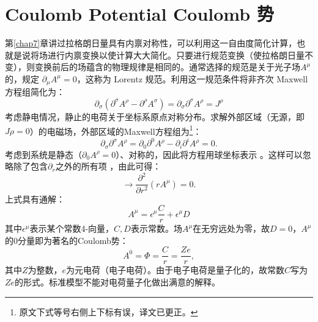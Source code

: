 \section[Coulomb 势]{Coulomb Potential \quad Coulomb 势}
\label{sec11.3}
第\ref{chap7}章讲过拉格朗日量具有内禀对称性，可以利用这一自由度简化计算，也就是说将场进行内禀变换以使计算大大简化。只要进行规范变换（使拉格朗日量不变），则变换前后的场蕴含的物理规律是相同的。通常选择的规范是关于光子场$A^\mu$的，规定%
%
$\partial_\mu A^\mu = 0$，这称为 Lorentz 规范。利用这一规范条件将非齐次 Maxwell 方程组简化为：
\begin{equation}
\label{equ11.21}
    \partial_\sigma (\partial^\sigma A^\rho - \partial^\rho A^\sigma) = \partial_\sigma \partial^\sigma A^\rho = J^\rho
\end{equation}
考虑静电情况，静止的电荷关于坐标系原点对称分布。求解外部区域（无源，即$J\rho = 0$）的电磁场，外部区域的Maxwell方程组为\footnote{原文下式等号右侧上下标有误，译文已更正。}：
\begin{equation}
\label{equ11.22}
    \partial_\sigma \partial^\sigma A^\rho = \partial_0 \partial^0 A^\rho - \partial_i \partial^i A^\rho = 0.
\end{equation}
考虑到系统是静态（$\partial_0 A^\rho = 0$）、对称的，因此将方程用球坐标表示%
%
。这样可以忽略除了包含$\partial_r$之外的所有项%
%
，由此可得：
\begin{equation}
\label{equ11.23}
    \to \frac{\partial^2}{\partial r^2} (r A^\mu) = 0.
\end{equation}
上式具有通解：
\begin{equation}
\label{equ11.24}
    A^\mu = \epsilon^\mu \frac{C}{r} + \epsilon^\mu D
\end{equation}
其中$\epsilon^\mu$表示某个常数4-向量，$C, D$表示常数。场$A^\mu$在无穷远处为零，故$D = 0$，$A^\mu$的$0$分量即为著名的Coulomb势：
\begin{equation}
\label{equ11.25}
    A^0 = \Phi = \frac{C}{r} = \frac{Ze}{r},
\end{equation}
其中$Z$为整数，$e$为元电荷（电子电荷）。由于电子电荷是量子化的，故常数$C$写为$Ze$的形式。标准模型不能对电荷量子化做出满意的解释。

